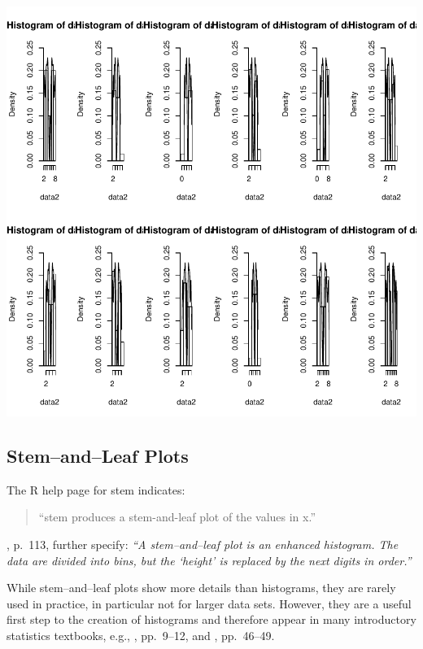 \includegraphics{lect_chapter5_v2-008}


\newpage


\subsection{Stem--and--Leaf Plots}


The R help page for stem indicates:
\begin{quotation}
``stem produces a stem-and-leaf plot of the values in x.''
\end{quotation}


\cite{VR2002}, p.~113, further specify: 
{\it ``A stem--and--leaf plot is an enhanced histogram. The data are
divided into bins, but the `height' is replaced by the next digits in order.''}

While stem--and--leaf plots show more details than histograms, they are rarely used
in practice, in particular not for larger data sets. However, they are a useful first step
to the creation of histograms and therefore appear in many introductory statistics
textbooks, e.g.,
\cite{MMC2012}, pp.~9--12, and
\cite{Bla1998}, pp.~46--49.



